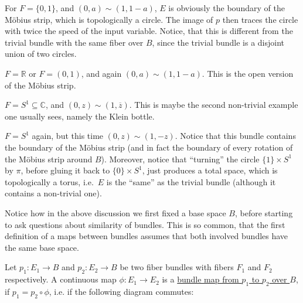 \begin{examples}
\begin{i_enum}
\item For $F=\{0,1\}$, and $(0,a)\sim(1,1-a)$, $E$ is obviously the boundary of the M\"obius strip, which is topologically a circle. The image of $p$ then traces the circle with twice the speed of the input variable. Notice, that this is different from the trivial bundle with the same fiber over $B$, since the trivial bundle is a disjoint union of two circles.
\item $F=\mathbb{R}$ or $F=(0,1)$, and again $(0,a)\sim(1,1-a)$. This is the open version of the M\"obius strip.
\item $F=S^1\subseteq\mathbb{C}$, and $(0,z)\sim(1,\overline{z})$. This is maybe the second non-trivial example one usually sees, namely the Klein bottle.
\item $F=S^1$ again, but this time $(0,z)\sim(1,-z)$. Notice that this bundle contains the boundary of the M\"obius strip (and in fact the boundary of every rotation of the M\"obius strip around $B$). Moreover, notice that ``turning'' the circle $\{1\}\times S^1$ by $\pi$, before gluing it back to $\{0\}\times S^1$, just produces a total space, which is topologically a torus, i.e.\ $E$ is the ``same'' as the trivial bundle (although it contains a non-trivial one).
\end{i_enum}
\end{examples}

Notice how in the above discussion we first fixed a base space $B$, before starting to ask questions about similarity of bundles. This is so common, that the first definition of a maps between bundles assumes that both involved bundles have the same base space.
\begin{definition}
Let $p_1:E_1\to B$ and $p_2:E_2\to B$ be two fiber bundles with fibers $F_1$ and $F_2$ respectively. A continuous map $\phi:E_1\to E_2$ is a \ul{bundle map from $p_1$ to $p_2$ over $B$}, if $p_1=p_2\circ\phi$, i.e. if the following diagram commutes:
\begin{center}
\end{center}
\end{definition}

